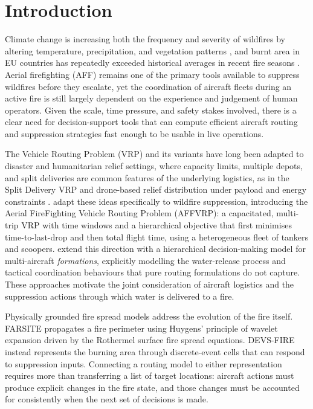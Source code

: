 \chapter{Introduction}
\label{ch:introduction}

Climate change is increasing both the frequency and severity of wildfires by altering temperature, precipitation, and vegetation patterns \cite{dennison2009climate}, and burnt area in EU countries has repeatedly exceeded historical averages in recent fire seasons \cite{effis2024}. Aerial firefighting (AFF) remains one of the primary tools available to suppress wildfires before they escalate, yet the coordination of aircraft fleets during an active fire is still largely dependent on the experience and judgement of human operators. Given the scale, time pressure, and safety stakes involved, there is a clear need for decision-support tools that can compute efficient aircraft routing and suppression strategies fast enough to be usable in live operations.

The Vehicle Routing Problem (VRP) and its variants have long been adapted to disaster and humanitarian relief settings, where capacity limits, multiple depots, and split deliveries are common features of the underlying logistics, as in the Split Delivery VRP \cite{dror1989split} and drone-based relief distribution under payload and energy constraints \cite{rabta2018drone}. \citet{chalabi2024affvrp} adapt these ideas specifically to wildfire suppression, introducing the Aerial FireFighting Vehicle Routing Problem (AFFVRP): a capacitated, multi-trip VRP with time windows and a hierarchical objective that first minimises time-to-last-drop and then total flight time, using a heterogeneous fleet of tankers and scoopers. \citet{liu2025hierarchical} extend this direction with a hierarchical decision-making model for multi-aircraft \emph{formations}, explicitly modelling the water-release process and tactical coordination behaviours that pure routing formulations do not capture. These approaches motivate the joint consideration of aircraft logistics and the suppression actions through which water is delivered to a fire.

Physically grounded fire spread models address the evolution of the fire itself. FARSITE \cite{finney1998farsite} propagates a fire perimeter using Huygens' principle of wavelet expansion driven by the Rothermel surface fire spread equations. DEVS-FIRE \cite{hu2012devsfire} instead represents the burning area through discrete-event cells that can respond to suppression inputs. Connecting a routing model to either representation requires more than transferring a list of target locations: aircraft actions must produce explicit changes in the fire state, and those changes must be accounted for consistently when the next set of decisions is made.

